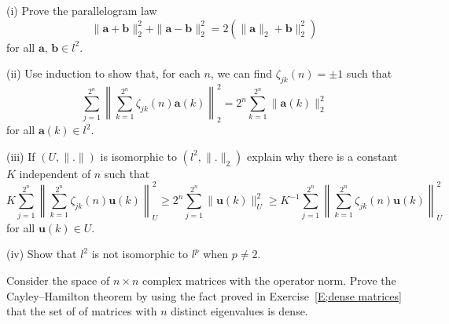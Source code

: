 \begin{exercise}\label{E;not Hilbert}\label{C5.5} 
(i) Prove the parallelogram law
\[\|{\mathbf a}+{\mathbf b}\|_{2}^{2}
+\|{\mathbf a}-{\mathbf b}\|_{2}^{2}
=2(\|{\mathbf a}\|_{2}+{\mathbf b}\|_{2}^{2})\]
for all ${\mathbf a},\,{\mathbf b}\in l^{2}$.

(ii) Use induction to show that, for each $n$, we can find
$\zeta_{jk}(n)=\pm 1$ such that
\[\sum_{j=1}^{2^{n}}\left\|\sum_{k=1}^{2^{n}}
\zeta_{jk}(n){\mathbf a}(k)\right\|_{2}^{2}
=2^{n}\sum_{k=1}^{2^{n}}\|{\mathbf a}(k)\|_{2}^{2}\]
for all ${\mathbf a}(k)\in l^{2}$.

(iii) If $(U,\|.\|)$ is isomorphic to $(l^{2},\|.\|_{2})$
explain why there is a constant $K$ independent of $n$
such that
\[K\sum_{j=1}^{2^{n}}\left\|\sum_{k=1}^{2^{n}}
\zeta_{jk}(n){\mathbf u}(k)\right\|_{U}^{2}
\geq 2^{n}\sum_{j=1}^{2^{n}}\|{\mathbf u}(k)\|_{U}^{2}
\geq K^{-1}\sum_{j=1}^{2^{n}}\left\|\sum_{k=1}^{2^{n}}
\zeta_{jk}(n){\mathbf u}(k)\right\|_{U}^{2}\]
for all ${\mathbf u}(k)\in U$.

(iv) Show that $l^{2}$ is not isomorphic to $l^{p}$
when $p\neq 2$.
\end{exercise}
\begin{exercise}\label{C5.6}
Consider the space of $n\times n$ complex
matrices with the operator norm.
Prove the Cayley--Hamilton theorem by using
the fact proved in Exercise~\ref{E;dense matrices}
that the set of of matrices 
with $n$ distinct eigenvalues
is dense.
\end{exercise}
